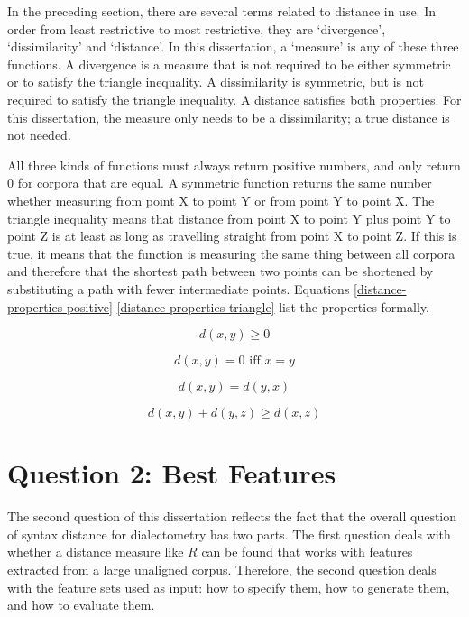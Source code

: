 In the preceding section, there are several terms related to distance
in use. In order from least restrictive to most restrictive, they are
`divergence', `dissimilarity' and `distance'. In this dissertation, a
`measure' is any of these three functions. A divergence is a measure
that is not required to be either symmetric or to satisfy the triangle
inequality. A dissimilarity is symmetric, but is not required to
satisfy the triangle inequality. A distance satisfies both
properties. For this dissertation, the measure only needs to be a
dissimilarity; a true distance is not needed.

All three kinds of functions must always return positive numbers, and
only return 0 for corpora that are equal.  A symmetric function
returns the same number whether measuring from point X to point Y or
from point Y to point X. The triangle inequality means that distance
from point X to point Y plus point Y to point Z is at least as long as
travelling straight from point X to point Z.  If this is true, it
means that the function is measuring the same thing between all
corpora and therefore that the shortest path between two points can be
shortened by substituting a path with fewer intermediate
points. Equations
\ref{distance-properties-positive}-\ref{distance-properties-triangle}
list the properties formally.

\begin{equation}
  d(x,y) \ge 0
  \label{distance-properties-positive}
\end{equation}

\begin{equation}
 d(x,y) = 0 \textrm{ iff } x=y
\end{equation}

\begin{equation}
  d(x,y) = d(y,x)
\end{equation}

\begin{equation}
  d(x,y) + d(y,z) \ge d(x,z)
\label{distance-properties-triangle}
\end{equation}

\section{Question 2: Best Features}

The second question of this dissertation reflects the fact that the
overall question of syntax distance for dialectometry has two
parts. The first question deals with whether a distance measure like
$R$ can be found that works with features extracted from a
large unaligned corpus. Therefore, the second question deals with the
feature sets used as input: how to specify them, how to generate them,
and how to evaluate them.

